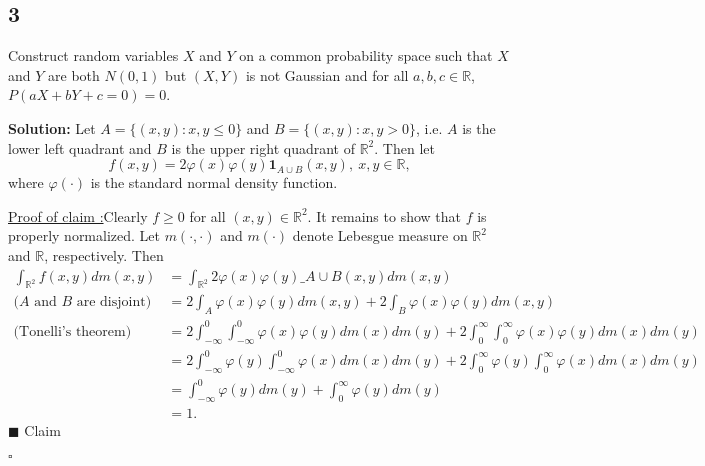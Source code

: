 \documentclass[12pt]{article}
\newcounter{ProofCounter}
\newcounter{ClaimCounter}[ProofCounter]
\newenvironment{Solution}{\stepcounter{ProofCounter}\textbf{Solution:}}{\hfill$\square$}
\newenvironment{claim}[1]{\vspace{1mm}\stepcounter{ClaimCounter}\par\noindent\underline{\bf Claim \theClaimCounter:}\space#1}{}
\newenvironment{claimproof}[1]{\par\noindent\underline{Proof of claim \theClaimCounter:}\space#1}{\hfill $\blacksquare$ Claim \theClaimCounter}
\begin{document}

\subsection*{3}
\begin{tcolorbox}
  Construct random variables $X$ and $Y$ on a common probability space such that $X$ and $Y$ are both $N(0,1)$ but $(X, Y)$ is not Gaussian and for all $a, b, c \in \mathbb{R}$, $P(aX + bY + c = 0) = 0$.
\end{tcolorbox}
\begin{Solution}
  Let $A = \{ (x,y) : x, y \leq 0 \}$ and $B = \{ (x,y) : x, y > 0 \}$, i.e. $A$ is the lower left quadrant and $B$ is the upper right quadrant of $\mathbb{R}^{2}$. Then let
  \[
    f(x,y) = 2 \varphi(x) \varphi(y) \bm{1}_{A\cup B}(x,y), \ x, y \in \mathbb{R},
  \]
  where $\varphi(\cdot)$ is the standard normal density function.
  \begin{claimproof}
    Clearly $f \geq 0$ for all $(x, y) \in \mathbb{R}^2$. It remains to show that $f$ is properly normalized. Let $m(\cdot, \cdot)$ and $m(\cdot)$ denote Lebesgue measure on $\mathbb{R}^2$ and $\mathbb{R}$, respectively. Then
    \begin{align*}
      \int_{\mathbb{R}^2} f(x,y) dm(x,y) & = \int_{\mathbb{R}^2} 2\varphi(x) \varphi(y) \bm_{A\cup B}(x, y) dm(x,y) \\
      \text{($A$ and $B$ are disjoint)} \ \ \ & = 2 \int_{A} \varphi(x) \varphi(y) dm(x, y) + 2 \int_{B} \varphi(x) \varphi(y) dm(x, y) \\
      \text{(Tonelli's theorem)}\ \ \ & = 2 \int_{-\infty}^{0} \int_{-\infty}^{0} \varphi(x) \varphi(y) dm(x) dm(y) + 2 \int_{0}^{\infty} \int_{0}^{\infty} \varphi(x) \varphi(y) dm(x) dm(y) \\
      & = 2 \int_{-\infty}^{0} \varphi(y) \int_{-\infty}^{0} \varphi(x) dm(x) dm(y) + 2 \int_{0}^{\infty}\varphi(y) \int_{0}^{\infty} \varphi(x) dm(x) dm(y) \\
      & = \int_{-\infty}^{0} \varphi(y) dm(y) + \int_{0}^{\infty} \varphi(y) dm(y) \\
      & = 1.
    \end{align*}
  \end{claimproof}


\end{Solution}
\end{document}
